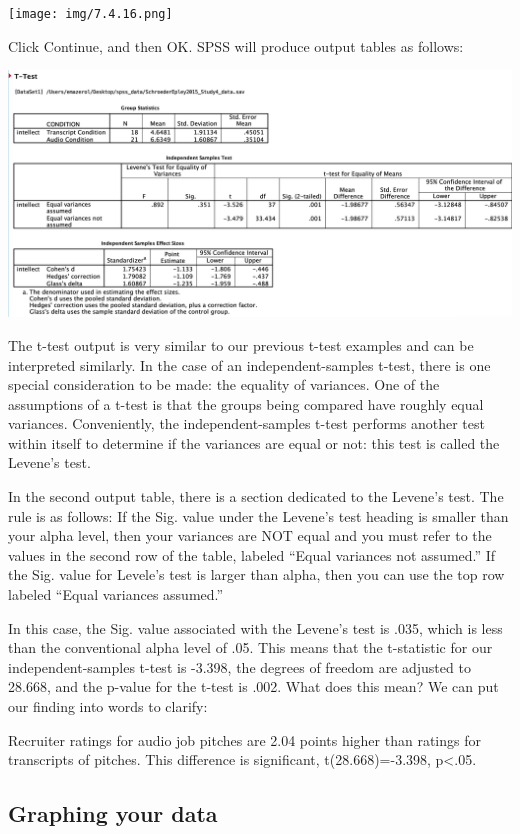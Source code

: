 \documentclass[]{book}
\begin{document}
\texttt{[image: img/7.4.16.png]}

Click {Continue}, and then {OK}. SPSS will produce output tables as
follows:

\includegraphics{img/7.4.17.png}

The t-test output is very similar to our previous t-test examples and
can be interpreted similarly. In the case of an independent-samples
t-test, there is one special consideration to be made: the equality of
variances. One of the assumptions of a t-test is that the groups being
compared have roughly equal variances. Conveniently, the
independent-samples t-test performs another test within itself to
determine if the variances are equal or not: this test is called the
Levene's test.

In the second output table, there is a section dedicated to the Levene's
test. The rule is as follows: If the Sig. value under the Levene's test
heading is smaller than your alpha level, then your variances are NOT
equal and you must refer to the values in the second row of the table,
labeled ``Equal variances not assumed.'' If the Sig. value for Levele's
test is larger than alpha, then you can use the top row labeled ``Equal
variances assumed.''

In this case, the Sig. value associated with the Levene's test is .035,
which is less than the conventional alpha level of .05. This means that
the t-statistic for our independent-samples t-test is -3.398, the
degrees of freedom are adjusted to 28.668, and the p-value for the
t-test is .002. What does this mean? We can put our finding into words
to clarify:

Recruiter ratings for audio job pitches are 2.04 points higher than
ratings for transcripts of pitches. This difference is significant,
t(28.668)=-3.398, p\textless{}.05.

\subsection{Graphing your data}\label{graphing-your-data}
\end{document}
